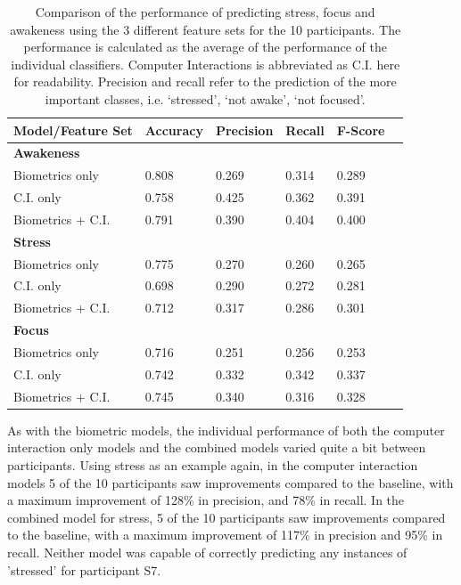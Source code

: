 \begin{table}
\begin{center}
\begin{tabular}{llllll}
\hline
Model/Feature Set & Accuracy & Precision & Recall & F-Score\\
\hline
\textbf{Awakeness}\\
\hspace{3mm}Biometrics only & 0.808 & 0.269 & 0.314 & 0.289\\
\hspace{3mm}C.I. only & 0.758 & 0.425 & 0.362 & 0.391\\
\hspace{3mm}Biometrics + C.I. & 0.791 & 0.390 & 0.404 & 0.400\\
\hline
\textbf{Stress}\\
\hspace{3mm}Biometrics only & 0.775 & 0.270 &	0.260 & 0.265\\
\hspace{3mm}C.I. only & 0.698 & 0.290 & 0.272 & 0.281\\
\hspace{3mm}Biometrics + C.I. & 0.712 & 0.317 & 0.286 & 0.301\\
\hline
\textbf{Focus}\\
\hspace{3mm}Biometrics only & 0.716 & 0.251 & 0.256 & 0.253\\
\hspace{3mm}C.I. only & 0.742 & 0.332 & 0.342 & 0.337\\
\hspace{3mm}Biometrics + C.I. & 0.745 & 0.340 & 0.316 & 0.328\\
\hline
\end{tabular}
\caption{Comparison of the performance of predicting stress, focus and awakeness using the 3 different feature sets for the 10 participants. The performance is calculated as the average of the performance of the individual classifiers. Computer Interactions is abbreviated as C.I. here for readability. Precision and recall refer to the prediction of the more important classes, i.e. `stressed', `not awake', `not focused'.}
\label{ciPerformance}
\end{center}
\vspace*{-6mm}
\end{table}

As with the biometric models, the individual performance of both the computer interaction only models and the combined models varied quite a bit between participants. Using stress as an example again, in the computer interaction models 5 of the 10 participants saw improvements compared to the baseline, with a maximum improvement of 128\% in precision, and 78\% in recall. In the combined model for stress, 5 of the 10 participants saw improvements compared to the baseline, with a maximum improvement of 117\% in precision and 95\% in recall. Neither model was capable of correctly predicting any instances of 'stressed' for participant S7.


